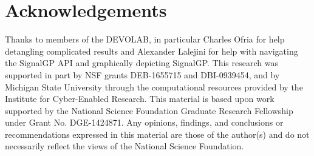 \section{Acknowledgements}

Thanks to members of the DEVOLAB, in particular Charles Ofria for help detangling complicated results and Alexander Lalejini for help with navigating the SignalGP API and graphically depicting SignalGP.
This research was supported in part by NSF grants DEB-1655715 and DBI-0939454, and by Michigan State University through the computational resources provided by the Institute for Cyber-Enabled Research.
This material is based upon work supported by the National Science Foundation Graduate Research Fellowship under Grant No. DGE-1424871.
Any opinions, findings, and conclusions or recommendations expressed in this material are those of the author(s) and do not necessarily reflect the views of the National Science Foundation.
